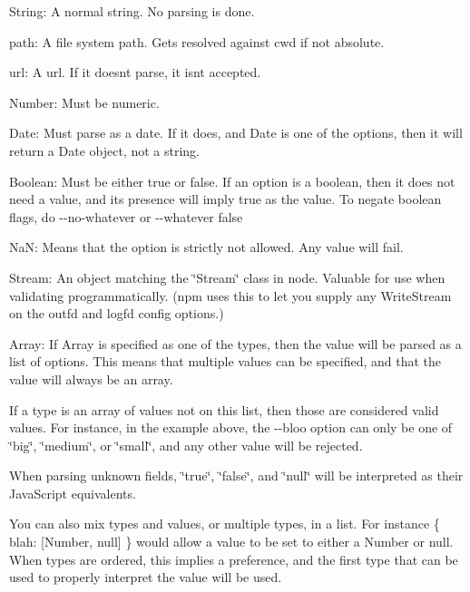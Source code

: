 \begin{DoxyItemize}
\item String\+: A normal string. No parsing is done.
\item path\+: A file system path. Gets resolved against cwd if not absolute.
\item url\+: A url. If it doesn\textquotesingle{}t parse, it isn\textquotesingle{}t accepted.
\item Number\+: Must be numeric.
\item Date\+: Must parse as a date. If it does, and {\ttfamily Date} is one of the options, then it will return a Date object, not a string.
\item Boolean\+: Must be either {\ttfamily true} or {\ttfamily false}. If an option is a boolean, then it does not need a value, and its presence will imply {\ttfamily true} as the value. To negate boolean flags, do {\ttfamily -\/-\/no-\/whatever} or {\ttfamily -\/-\/whatever false}
\item Na\+N\+: Means that the option is strictly not allowed. Any value will fail.
\item Stream\+: An object matching the \char`\"{}\+Stream\char`\"{} class in node. Valuable for use when validating programmatically. (npm uses this to let you supply any Write\+Stream on the {\ttfamily outfd} and {\ttfamily logfd} config options.)
\item Array\+: If {\ttfamily Array} is specified as one of the types, then the value will be parsed as a list of options. This means that multiple values can be specified, and that the value will always be an array.
\end{DoxyItemize}

If a type is an array of values not on this list, then those are considered valid values. For instance, in the example above, the {\ttfamily -\/-\/bloo} option can only be one of {\ttfamily \char`\"{}big\char`\"{}}, {\ttfamily \char`\"{}medium\char`\"{}}, or {\ttfamily \char`\"{}small\char`\"{}}, and any other value will be rejected.

When parsing unknown fields, {\ttfamily \char`\"{}true\char`\"{}}, {\ttfamily \char`\"{}false\char`\"{}}, and {\ttfamily \char`\"{}null\char`\"{}} will be interpreted as their Java\+Script equivalents.

You can also mix types and values, or multiple types, in a list. For instance {\ttfamily \{ blah\+: \mbox{[}Number, null\mbox{]} \}} would allow a value to be set to either a Number or null. When types are ordered, this implies a preference, and the first type that can be used to properly interpret the value will be used.

